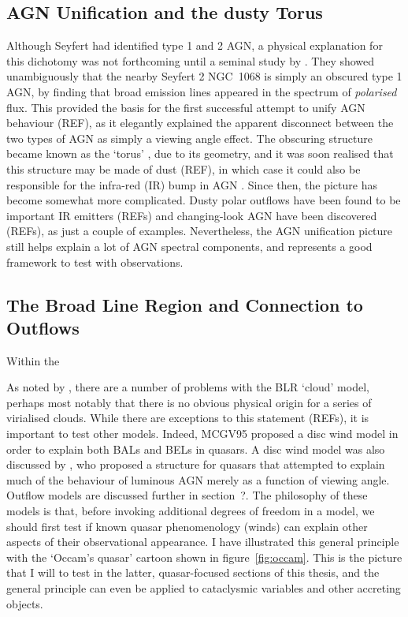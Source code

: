 \subsection{AGN Unification and the dusty Torus}

Although Seyfert had identified type 1 and 2 AGN, a physical explanation
for this dichotomy was not forthcoming until a seminal study by \cite{antonucci1985}.
They showed unambiguously that the nearby Seyfert 2 NGC~1068 is simply an obscured
type 1 AGN, by finding that broad emission lines appeared in the spectrum of
{\em polarised} flux. This provided the basis for the first successful attempt
to unify AGN behaviour (REF), as it elegantly explained the apparent disconnect between
the two types of AGN as simply a viewing angle effect. The obscuring structure became known as 
the `torus' \citep{krolik1986}, due to its geometry, and it was soon realised that this structure
may be made of dust (REF), in which case it could also be responsible for the infra-red (IR)
bump in AGN \citep{neugebauer1979}. 
Since then, the picture has become somewhat more complicated. Dusty polar outflows
have been found to be important IR emitters (REFs) and changing-look 
AGN have been discovered (REFs), as just a couple of examples.
Nevertheless, the AGN unification picture still helps explain a lot of AGN spectral components,
and represents a good framework to test with observations. 

\subsection{The Broad Line Region and Connection to Outflows}

Within the 

As noted by \cite[][hereafter MCGC95]{MCGV95}, there are a number of problems with
the BLR `cloud' model, perhaps most notably that there is no obvious 
physical origin for a series of virialised clouds. While there are exceptions
to this statement (REFs), it is important to test other models.
Indeed, MCGV95 proposed a disc wind model in order to explain both BALs and BELs
in quasars. A disc wind model was also  discussed by \cite{elvis2000}, 
who proposed a structure for quasars that attempted to explain much 
of the behaviour of luminous AGN
merely as a function of viewing angle. Outflow models are discussed further in section~?.
The philosophy of these models is that, before invoking additional
degrees of freedom in a model, we should first test if known quasar phenomenology 
(winds) can explain other aspects of their observational appearance.
I have illustrated this general principle with the `Occam's quasar' 
cartoon shown in figure~\ref{fig:occam}. This is the picture that I will
to test in the latter, quasar-focused sections of this thesis, and the general
principle can even be applied to cataclysmic variables and other accreting objects.



